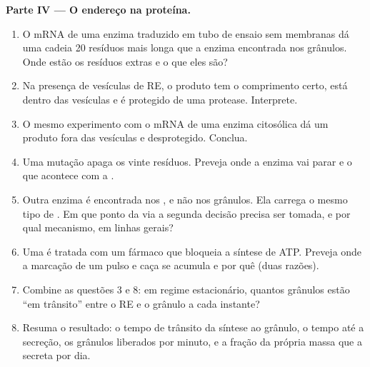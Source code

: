 \begin{problem}
\medskip
\noindent\textbf{Parte IV --- O endereço na proteína.}
\begin{enumerate}[resume]
  \item O mRNA de uma enzima traduzido em tubo de ensaio sem membranas
        dá uma cadeia \qty{20}{} resíduos mais longa que a enzima
        encontrada nos grânulos. Onde estão os resíduos extras e o que
        eles são?
  \item Na presença de vesículas de RE, o produto tem o comprimento
        certo, está dentro das vesículas e é protegido de uma protease.
        Interprete.
  \item O mesmo experimento com o mRNA de uma enzima citosólica dá um
        produto fora das vesículas e desprotegido. Conclua.
  \item Uma mutação apaga os vinte resíduos. Preveja onde a enzima vai
        parar e o que acontece com a .
  \item Outra enzima é encontrada nos , e não nos grânulos.
        Ela carrega o mesmo tipo de . Em que ponto da via
        a segunda decisão precisa ser tomada, e por qual mecanismo, em
        linhas gerais?
  \item Uma  é tratada com um fármaco que bloqueia a síntese de
        ATP. Preveja onde a marcação de um pulso e caça se acumula e por
        quê (duas razões).
  \item Combine as questões 3 e 8: em regime estacionário, quantos
        grânulos estão ``em trânsito'' entre o RE e o grânulo a cada
        instante?
  \item Resuma o resultado: o tempo de trânsito da síntese ao grânulo, o
        tempo até a secreção, os grânulos liberados por minuto, e a
        fração da própria massa que a  secreta por dia.
\end{enumerate}
\end{problem}
